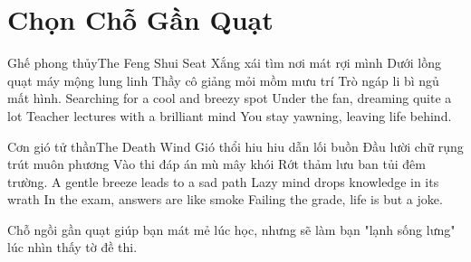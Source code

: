 \chapter{Chọn Chỗ Gần Quạt}

\begin{tutuyetbox}{Ghế phong thủy}{The Feng Shui Seat}
Xắng xái tìm nơi mát rợi mình
Dưới lồng quạt máy mộng lung linh
Thầy cô giảng mỏi mồm mưu trí
Trò ngáp li bì ngủ mất hình.
\tcblower
Searching for a cool and breezy spot 
Under the fan, dreaming quite a lot 
Teacher lectures with a brilliant mind 
You stay yawning, leaving life behind.
\end{tutuyetbox}

\begin{tutuyetbox}{Cơn gió tử thần}{The Death Wind}
Gió thổi hiu hiu dẫn lối buồn
Đầu lười chữ rụng trút muôn phương
Vào thi đáp án mù mây khói
Rớt thảm lưu ban tủi đêm trường.
\tcblower
A gentle breeze leads to a sad path 
Lazy mind drops knowledge in its wrath 
In the exam, answers are like smoke 
Failing the grade, life is but a joke.
\end{tutuyetbox}

\begin{ghichu}
Chỗ ngồi gần quạt giúp bạn mát mẻ lúc học, nhưng sẽ làm bạn "lạnh sống lưng" lúc nhìn thấy tờ đề thi.
\end{ghichu}
